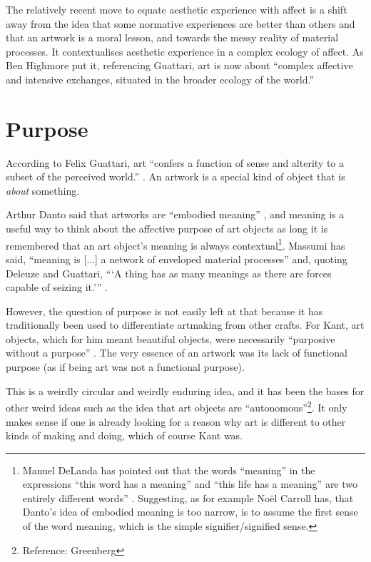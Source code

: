 \documentclass[letter:wpaper]{article}
\begin{document}
    The relatively recent move to equate aesthetic experience with affect is a shift away from the idea that some normative experiences are better than others and that an artwork is a moral lesson, and towards the messy reality of material processes. It contextualises aesthetic experience in a complex ecology of affect. As Ben Highmore put it, referencing Guattari, art is now about “complex affective and intensive exchanges, situated in the broader ecology of the world.” \citep[p.155]{HighmoreBttrAftrTst2010}

    \section{Purpose}

    According to Felix Guattari, art ``confers a function of sense and alterity to a subset of the perceived world.'' \citep[p.131]{GuattariChsmss1995}. An artwork is a special kind of object that is \emph{about} something.
    
    Arthur Danto said that artworks are ``embodied meaning'' \citep[p.125]{DantoEmbdMnngs2007}, and meaning is a useful way to think about the affective purpose of art objects as long it is remembered that an art object's meaning is always contextual\footnote{
        Manuel DeLanda has pointed out that the words ``meaning'' in the expressions ``this word has a meaning'' and ``this life has a meaning'' are two entirely different words'' \citep[pp.40–41]{DeLandaCsltyAndMnng2018}. Suggesting, as for example Noël Carroll has, that Danto's idea of embodied meaning is too narrow, is to assume the first sense of the word meaning, which is the simple signifier/signified sense.
    }. Massumi has said, ``meaning is [...] a network of enveloped material processes'' and, quoting Deleuze and Guattari, ``‘A thing has as many meanings as there are forces capable of seizing it.’'' \citep[p.10]{MassumiAUsrsGdTCptlsmAndSchzphrn1992}.

    However, the question of purpose is not easily left at that because it has traditionally been used to differentiate artmaking from other crafts. For Kant, art objects, which for him meant beautiful objects, were necessarily ``purposive without a purpose'' \citep[p.57]{KantCrtqOfJdgmnt}. The very essence of an artwork was its lack of functional purpose (as if being art was not a functional purpose).
    
    This is a weirdly circular and weirdly enduring idea, and it has been the bases for other weird ideas such as the idea that art objects are ``autonomous''\footnote{
        Reference: Greenberg
    }. It only makes sense if one is already looking for a reason why art is different to other kinds of making and doing, which of course Kant was.
    
\end{document}
